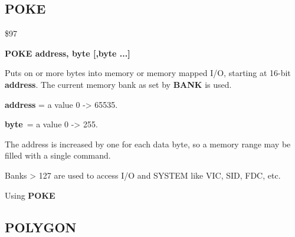 \subsection{POKE}
\begin{description}[leftmargin=3cm,style=nextline]
\item [Token:] \$97
\item [Format:] {\bf POKE address, byte [,byte ...] }
\item [Usage:]  Puts on or more bytes into memory
                or memory mapped I/O, starting at
                16-bit {\bf address}.
                The current memory bank as set by {\bf BANK} is used.

                {\bf address} = a value 0 -> 65535.

                {\bf byte} = a value 0 -> 255.

\item [Remarks:] The address is increased by one for each data byte,
                 so a memory range may be filled with a single command.

                 Banks > 127 are used to access I/O and SYSTEM
                 like VIC, SID, FDC, etc.
\item [Example:] Using {\bf POKE}

\end{description}


\newpage
\subsection{POLYGON}

